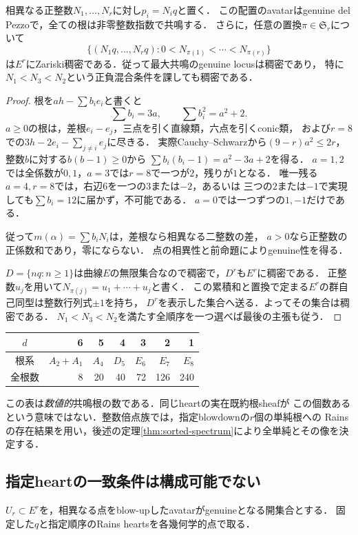 \begin{theorem}[全次数の最大共鳴は稠密]\label{thm:maximal-density-main}
相異なる正整数$N_1,\ldots,N_r$に対し$p_i=N_iq$と置く．
この配置のavatarはgenuine del Pezzoで，全ての根は非零整数指数で共鳴する．
さらに，任意の置換$\pi\in\mathfrak S_r$について
\[
 \{(N_1q,\ldots,N_rq):0<N_{\pi(1)}<\cdots<N_{\pi(r)}\}
\]
は$E^r$にZariski稠密である．従って最大共鳴のgenuine locusは稠密であり，
特に$N_1<N_3<N_2$という正負混合条件を課しても稠密である．
\end{theorem}
\begin{proof}
根を$ah-\sum b_ie_i$と書くと
\[
 \sum b_i=3a,\qquad \sum b_i^2=a^2+2.
\]
$a\ge0$の根は，差根$e_i-e_j$，三点を引く直線類，六点を引くconic類，
および$r=8$での$3h-2e_i-\sum_{j\ne i}e_j$に尽きる．
実際Cauchy--Schwarzから$(9-r)a^2\le2r$，
整数$b$に対する$b(b-1)\ge0$から
$\sum b_i(b_i-1)=a^2-3a+2$を得る．
$a=1,2$では全係数が$0,1$，$a=3$では$r=8$で一つが$2$，残りが$1$となる．
唯一残る$a=4,r=8$では，右辺$6$を一つの$3$または$-2$，あるいは
三つの$2$または$-1$で実現しても$\sum b_i=12$に届かず，不可能である．
$a=0$では一つずつの$1,-1$だけである．

従って$m(\alpha)=\sum b_iN_i$は，差根なら相異なる二整数の差，
$a>0$なら正整数の正係数和であり，零にならない．
点の相異性と前命題によりgenuine性を得る．

$D=\{nq:n\ge1\}$は曲線$E$の無限集合なので稠密で，$D^r$も$E^r$に稠密である．
正整数$u_j$を用いて$N_{\pi(j)}=u_1+\cdots+u_j$と書く．
この累積和と置換で定まる$E^r$の群自己同型は整数行列式$\pm1$を持ち，
$D^r$を表示した集合へ送る．よってその集合は稠密である．
$N_1<N_3<N_2$を満たす全順序を一つ選べば最後の主張も従う．
\end{proof}

\begin{center}
\begin{tabular}{c|rrrrrr}
$d$&6&5&4&3&2&1\\\hline
根系&$A_2+A_1$&$A_4$&$D_5$&$E_6$&$E_7$&$E_8$\\
全根数&8&20&40&72&126&240
\end{tabular}
\end{center}
この表は\emph{数値的}共鳴根の数である．同じheartの実在既約根sheafが
この個数あるという意味ではない．整数倍点族では，指定blowdownの$r$個の単純根への
Rainsの存在結果を用い，後述の定理\ref{thm:sorted-spectrum}により全単純とその像を決定する．

\subsection{指定heartの一致条件は構成可能でない}
$U_r\subset E^r$を，相異なる点をblow-upしたavatarがgenuineとなる開集合とする．
固定した$q$と指定順序のRains heartsを各幾何学的点で取る．

